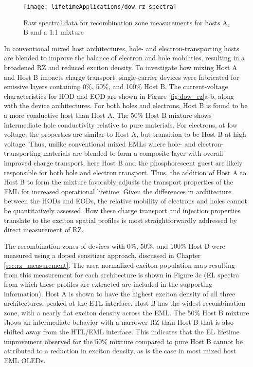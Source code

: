 \documentclass[../thesis.tex]{subfiles}
\begin{document}
\begin{wrapfigure}{r}{.5\textwidth}
\centering
\texttt{[image: lifetimeApplications/dow\_rz\_spectra]}
\caption{Raw spectral data for recombination zone measurements for hosts A, B and a 1:1 mixture}
\label{fig:dow_rz_spectra}
\end{wrapfigure}

In conventional mixed host architectures, hole- and electron-transporting hosts are blended to improve the balance of electron and hole mobilities, resulting in a broadened RZ and reduced exciton density.\supercite{Chwang2002,Erickson2013a,Han2016,Kondakova2008a}
To investigate how mixing Host A and Host B impacts charge transport, single-carrier devices were fabricated for emissive layers containing 0\%, 50\%, and 100\% Host B. 
The current-voltage characteristics for HOD and EOD are shown in Figure \ref{fig:dow_rz}a-b, along with the device architectures.
For both holes and electrons, Host B is found to be a more conductive host than Host A. 
The 50\% Host B mixture shows intermediate hole conductivity relative to pure materials. 
For electrons, at low voltage, the properties are similar to Host A, but transition to be Host B at high voltage. 
Thus, unlike conventional mixed EMLs where hole- and electron-transporting materials are blended to form a composite layer with overall improved charge transport, here Host B and the phosphorescent guest are likely responsible for both hole and electron transport. 
Thus, the addition of Host A to Host B to form the mixture favorably adjusts the transport properties of the EML for increased operational lifetime. 
Given the differences in architecture between the HODs and EODs, the relative mobility of electrons and holes cannot be quantitatively assessed. 
How these charge transport and injection properties translate to the exciton spatial profiles is most straightforwardly addressed by direct measurement of RZ.


The recombination zones of devices with 0\%, 50\%, and 100\% Host B were measured using a doped sensitizer approach, discussed in Chapter \ref{sec:rz_measurement}.\supercite{Bangsund2018}
The area-normalized exciton population map resulting from this measurement for each architecture is shown in Figure 3c (EL spectra from which these profiles are extracted are included in the supporting information). 
Host A is shown to have the highest exciton density of all three architectures, peaked at the ETL interface. 
Host B has the widest recombination zone, with a nearly flat exciton density across the EML. 
The 50\% Host B mixture shows an intermediate behavior with a narrower RZ than Host B that is also shifted away from the HTL/EML interface. 
This indicates that the EL lifetime improvement observed for the 50\% mixture compared to pure Host B cannot be attributed to a reduction in exciton density, as is the case in most mixed host EML OLEDs. 
\end{document}

